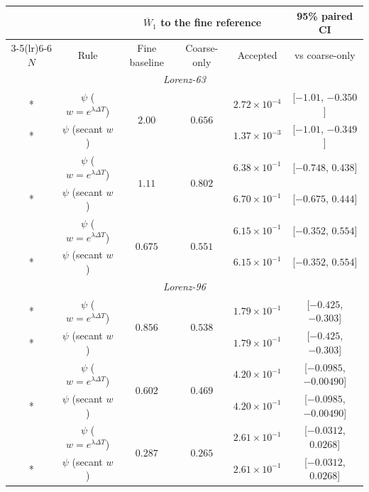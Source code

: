 \setlength{\tabcolsep}{1.5pt}\renewcommand{\arraystretch}{1.15}
\begin{tabular*}{\textwidth}{@{\extracolsep{\fill}}cccccc@{}}\toprule
& & \multicolumn{3}{c}{$\overline{W}_1$ to the fine reference} & 95\% paired CI\\
\cmidrule(lr){3-5}\cmidrule(lr){6-6}
$N$ & Rule & Fine baseline & Coarse-only & Accepted & vs coarse-only\\
\midrule
\multicolumn{6}{c}{\textit{Lorenz-63}}\\*
\multirow{2}{*}{$16$} & $\psi$ ($w=e^{\lambda\Delta T}$) & \multirow{2}{*}{$2.00$} & \multirow{2}{*}{$0.656$} & $2.72\times 10^{-4}$ & [$-1.01$, $-0.350$]\\*
 & $\psi$ (secant $w$) &  &  & $1.37\times 10^{-3}$ & [$-1.01$, $-0.349$]\\
\addlinespace[3pt]
\multirow{2}{*}{$32$} & $\psi$ ($w=e^{\lambda\Delta T}$) & \multirow{2}{*}{$1.11$} & \multirow{2}{*}{$0.802$} & $6.38\times 10^{-1}$ & [$-0.748$, $0.438$]\\*
 & $\psi$ (secant $w$) &  &  & $6.70\times 10^{-1}$ & [$-0.675$, $0.444$]\\
\addlinespace[3pt]
\multirow{2}{*}{$128$} & $\psi$ ($w=e^{\lambda\Delta T}$) & \multirow{2}{*}{$0.675$} & \multirow{2}{*}{$0.551$} & $6.15\times 10^{-1}$ & [$-0.352$, $0.554$]\\*
 & $\psi$ (secant $w$) &  &  & $6.15\times 10^{-1}$ & [$-0.352$, $0.554$]\\
\midrule
\multicolumn{6}{c}{\textit{Lorenz-96}}\\*
\multirow{2}{*}{$16$} & $\psi$ ($w=e^{\lambda\Delta T}$) & \multirow{2}{*}{$0.856$} & \multirow{2}{*}{$0.538$} & $1.79\times 10^{-1}$ & [$-0.425$, $-0.303$]\\*
 & $\psi$ (secant $w$) &  &  & $1.79\times 10^{-1}$ & [$-0.425$, $-0.303$]\\
\addlinespace[3pt]
\multirow{2}{*}{$32$} & $\psi$ ($w=e^{\lambda\Delta T}$) & \multirow{2}{*}{$0.602$} & \multirow{2}{*}{$0.469$} & $4.20\times 10^{-1}$ & [$-0.0985$, $-0.00490$]\\*
 & $\psi$ (secant $w$) &  &  & $4.20\times 10^{-1}$ & [$-0.0985$, $-0.00490$]\\
\addlinespace[3pt]
\multirow{2}{*}{$128$} & $\psi$ ($w=e^{\lambda\Delta T}$) & \multirow{2}{*}{$0.287$} & \multirow{2}{*}{$0.265$} & $2.61\times 10^{-1}$ & [$-0.0312$, $0.0268$]\\*
 & $\psi$ (secant $w$) &  &  & $2.61\times 10^{-1}$ & [$-0.0312$, $0.0268$]\\
\bottomrule\end{tabular*}
